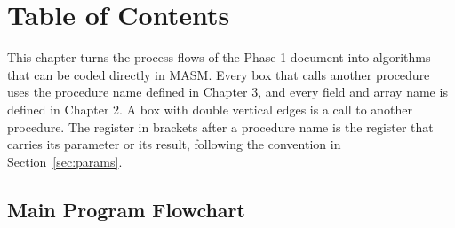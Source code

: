 \documentclass{thesis-library}
\begin{document}
\newcommand{\thesisTitle}{Cinema Ticket Reservation and Revenue Management System (CTRMS)\\[0.3cm]\large Phase 2: Design}
\newcommand{\byLabel}{By (Group 102):}
\newcommand{\studentName}{\begin{tabular}{c}Noureddin Ghazal (202511039)\\ Yousef Kitaneh (202311043)\\ Ahmad Jahaf (202310390)\end{tabular}}
\newcommand{\supervisorLabel}{Instructor:}
\newcommand{\supervisorName}{Dr. Khaled Al-Hashash}
\newcommand{\degreeLineALabel}{This project was submitted in Partial Fulfilment of the Requirements for the Microcomputer Systems and Assembly Language Course (1301224)}
\newcommand{\majorName}{}
\newcommand{\universityName}{Applied Science Private University}
\newcommand{\deanshipName}{Faculty of Information Technology}
\newcommand{\regionName}{Amman - Jordan}
\newcommand{\degreeyearName}{2026}
\newcommand{\degreemonthName}{November}

\makecoverpage


\newpage
\chapter*{\centering \Huge Table of Contents}
\tableofcontents
{}

\newpage
\listoftablesname

\newpage
\listoffiguresname

\newpage
{}



This chapter turns the process flows of the Phase 1 document into algorithms that can be coded directly in MASM. Every box that calls another procedure uses the procedure name defined in Chapter 3, and every field and array name is defined in Chapter 2. A box with double vertical edges is a call to another procedure. The register in brackets after a procedure name is the register that carries its parameter or its result, following the convention in Section~\ref{sec:params}.

\section{Main Program Flowchart}
\end{document}
